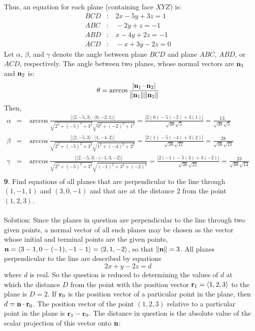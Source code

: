 \documentclass[12pt]{amsbook}
\newcommand{\la}{\langle}
\newcommand{\ra}{\rangle}
\begin{document}
Thus, an equation for each plane (containing face $XYZ$) is:
\begin{eqnarray*}
BCD&:& \ 2x-5y+3z=1 \\
ABC&:& \ -2y+z=-1 \\
ABD&:& \ x-4y+2z=-1 \\
ACD&:& \ -x+3y-2z=0 
\end{eqnarray*}
Let $\alpha$, $\beta$, and $\gamma$ denote the angle between plane $BCD$ and plane $ABC$, $ABD$, or $ACD$, respectively. The angle between two planes, whose normal vectors are ${\bf n}_1$ and ${\bf n}_2$ is:
$$\theta=\arccos\frac{|{\bf n}_1\cdot{\bf n}_2|}{\|{\bf n}_1\|\|{\bf n}_2\|}$$
Then,
\begin{eqnarray*}
\alpha&=&\arccos\frac{|\la 2,-5,3\ra \cdot \la 0,-2,1 \ra|}{\sqrt{2^2+(-5)^2+3^2}\sqrt{0^2+(-2)^2+1^2}}=\frac{|2(0)-5(-2)+3(1)|}{\sqrt{38}\sqrt{5}}=\frac{13}{\sqrt{38}\sqrt{5}}\\
\beta&=&\arccos\frac{|\la 2,-5,3\ra \cdot \la 1,-4,2 \ra|}{\sqrt{2^2+(-5)^2+3^2}\sqrt{1^2+(-4)^2+2^2}}=\frac{|2(1)-5(-4)+3(2)|}{\sqrt{38}\sqrt{21}}=\frac{28}{\sqrt{38}\sqrt{21}}\\
\gamma&=&\arccos\frac{|\la 2,-5,3\ra \cdot \la -1,3,-2 \ra|}{\sqrt{2^2+(-5)^2+3^2}\sqrt{(-1)^2+3^2+(-2)^2}}=\frac{|2(-1)-5(3)+3(-2)|}{\sqrt{38}\sqrt{21}}=\frac{23}{\sqrt{38}\sqrt{14}}\\
\end{eqnarray*}
{\small\bf 9}. Find equations of all 
planes that are perpendicular
to
the line through $(1,-1,1)$ and $(3,0,-1)$
and that are at the distance $2$ from the point $(1,2,3)$.\\
\\
{\sc Solution}: Since the planes in question
are perpendicular to the line through two given points,
a normal vector of all such planes may be chosen as the vector 
whose initial and terminal points are the given points,
${\bf n}=\langle 3-1,0-(-1),-1-1\rangle=\langle 2,1,-2\rangle$,
so that $\|{\bf n}\|=3$. All planes perpendicular to the 
line are described by equations 
$$
2x+y-2z=d
$$
where $d$ is real. So the question is reduced to determining 
the values of $d$ at which the distance $D$ from the point
with the position vector ${\bf r}_1=\langle 1,2,3\rangle$ to 
the plane is $D=2$. If ${\bf r}_0$ is the position vector 
of a particular point in the plane, then $d={\bf n}\cdot{\bf r}_0$.
The position vector of the point $(1,2,3)$ relative to 
a particular point in the plane is ${\bf r}_1-{\bf r}_0$.
The distance in question is the absolute value of the 
scalar projection of this vector onto ${\bf n}$:
\end{document}
